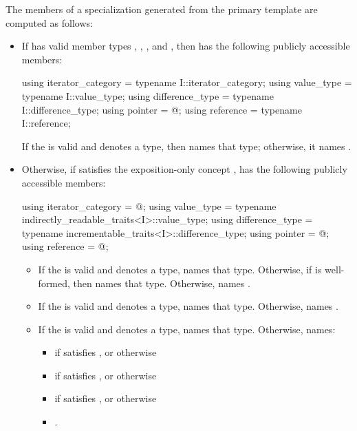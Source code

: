\pnum
The members of a specialization  generated from the
 primary template are computed as follows:
\begin{itemize}
\item
If  has valid member
types , ,
, and ,
then
has the following publicly accessible members:
\begin{codeblock}
using iterator_category = typename I::iterator_category;
using value_type        = typename I::value_type;
using difference_type   = typename I::difference_type;
using pointer           = @\seebelow@;
using reference         = typename I::reference;
\end{codeblock}
If the   is valid and
denotes a type, then  names that type;
otherwise, it names .

\item
Otherwise, if  satisfies the exposition-only concept
,
 has the following
publicly accessible members:
\begin{codeblock}
using iterator_category = @\seebelow@;
using value_type        = typename indirectly_readable_traits<I>::value_type;
using difference_type   = typename incrementable_traits<I>::difference_type;
using pointer           = @\seebelow@;
using reference         = @\seebelow@;
\end{codeblock}
\begin{itemize}
\item If the   is valid and denotes a type,
 names that type. Otherwise, if
 is well-formed, then
 names that type. Otherwise, 
names .

\item If the   is valid and denotes a
type,  names that type. Otherwise, 
names .

\item If the   is valid and
denotes a type,  names that type.
Otherwise,  names:
\begin{itemize}
\item
{}
if
 satisfies ,
or otherwise
\item
{} if
 satisfies ,
or otherwise
\item
{} if
 satisfies ,
or otherwise
\item
{}.
\end{itemize}
\end{itemize}


\end{itemize}

